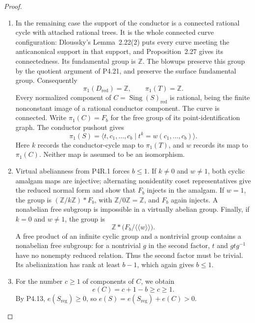 \begin{proof}
\begin{enumerate}[label={$\langle1\rangle$\arabic*.},leftmargin=*]
\item In the remaining case the support of the conductor is
a connected rational cycle with attached rational trees.
It is the whole connected curve configuration: Dloussky's
Lemma~2.22(2) puts every curve meeting the anticanonical
support in that support, and Proposition~2.27 gives its
connectedness. Its fundamental group is $\mathbb Z$.
The blowups preserve this group by the quotient argument
of P4.21, and preserve the surface fundamental group.
Consequently
\[
 \pi_1(D_{\mathrm{red}})=\mathbb Z,\qquad
 \pi_1(T)=\mathbb Z.
\]
Every normalized component of
$C=\operatorname{Sing}(S)_{\mathrm{red}}$ is rational,
being the finite nonconstant image of a rational conductor
component. The curve is connected. Write $\pi_1(C)=F_b$
for the free group of its point-identification graph.
The conductor pushout gives
\[
 \pi_1(S)=
 \langle t,c_1,\ldots,c_b\mid t^k=w(c_1,\ldots,c_b)\rangle.
\]
Here $k$ records the conductor-cycle map to $\pi_1(T)$,
and $w$ records its map to $\pi_1(C)$. Neither map is
assumed to be an isomorphism.

\item Virtual abelianness from P4R.1 forces $b\le1$.
If $k\ne0$ and $w\ne1$, both cyclic amalgam maps are
injective; alternating nonidentity coset representatives
give the reduced normal form and show that $F_b$ injects
in the amalgam. If $w=1$, the group is
$(\mathbb Z/k\mathbb Z)*F_b$, with
$\mathbb Z/0\mathbb Z=\mathbb Z$, and $F_b$ again
injects. A nonabelian free subgroup is impossible in a
virtually abelian group. Finally, if $k=0$ and $w\ne1$,
the group is
\[
 \mathbb Z*\bigl(F_b/\langle\!\langle w\rangle\!\rangle\bigr).
\]
A free product of an infinite cyclic group and a nontrivial
group contains a nonabelian free subgroup: for a nontrivial
$g$ in the second factor, $t$ and $gtg^{-1}$ have no
nonempty reduced relation. Thus the second factor must
be trivial. Its abelianization has rank at least $b-1$,
which again gives $b\le1$.

\item For the number $c\ge1$ of components of $C$, we obtain
\[
 e(C)=c+1-b\ge c\ge1.
\]
By P4.13, $e(S_{\mathrm{reg}})\ge0$, so
$e(S)=e(S_{\mathrm{reg}})+e(C)>0$.

\end{enumerate}
\end{proof}
